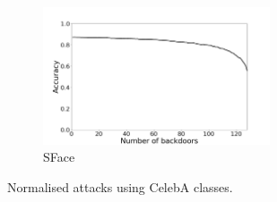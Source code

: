 \documentclass{article}
\theoremstyle{plain}
\theoremstyle{definition}
\theoremstyle{remark}
\begin{document}
\begin{figure}[t!]
    \hfill 
    \begin{subfigure}[t]{0.45\linewidth}
        \centering
        \includegraphics[height=1.6in]{figures/normalised_attack_SFace_opencv_cosine_128.png}
        \caption{SFace}
    \end{subfigure}
    \caption{Normalised attacks using CelebA classes.}
\end{figure}
\end{document}
